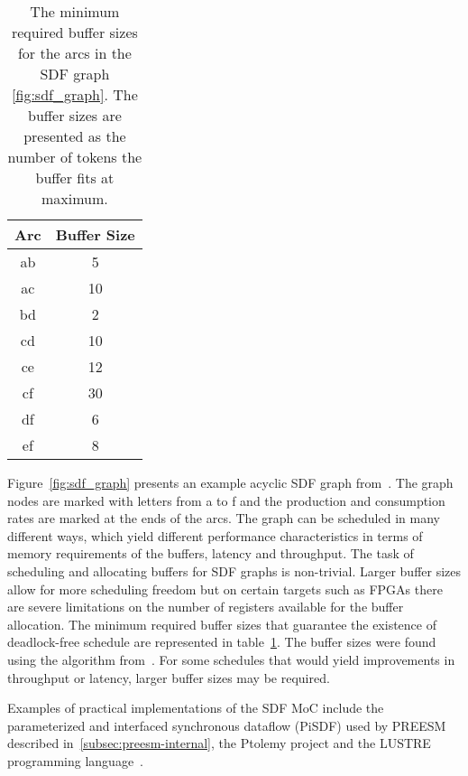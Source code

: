 \begin{table}
    \begin{center}
        \begin{tabular}{ c c }
            Arc & Buffer Size \\ \hline
            ab  & 5 \\ \hline
            ac  & 10 \\ \hline
            bd  & 2 \\ \hline
            cd  & 10 \\ \hline
            ce  & 12 \\ \hline
            cf  & 30 \\ \hline
            df  & 6 \\ \hline
            ef  & 8 \\ \hline
        \end{tabular}
        \caption{The minimum required buffer sizes for the arcs in the SDF graph \ref{fig:sdf_graph}. The buffer sizes are presented as the number of tokens the buffer fits at maximum.}
        \label{tab:sdf_buffers}
    \end{center}
\end{table}

Figure~\ref{fig:sdf_graph} presents an example acyclic SDF graph from~\cite{ade1997data}. The graph nodes are marked with letters from a to f and the production and consumption rates are marked at the ends of the arcs. The graph can be scheduled in many different ways, which yield different performance characteristics in terms of memory requirements of the buffers, latency and throughput. The task of scheduling and allocating buffers for SDF graphs is non-trivial. Larger buffer sizes allow for more scheduling freedom but on certain targets such as FPGAs there are severe limitations on the number of registers available for the buffer allocation. The minimum required buffer sizes that guarantee the existence of deadlock-free schedule are represented in table~\ref{tab:sdf_buffers}. The buffer sizes were found using the algorithm from~\cite{ade1997data}. For some schedules that would yield improvements in throughput or latency, larger buffer sizes may be required.

Examples of practical implementations of the SDF MoC include the parameterized and interfaced synchronous dataflow (PiSDF) used by PREESM described in~\ref{subsec:preesm-internal}, the Ptolemy project \cite{ekerjanneck2003ptolemy} and the LUSTRE programming language~\cite{halbwachs1991synchronous}.

